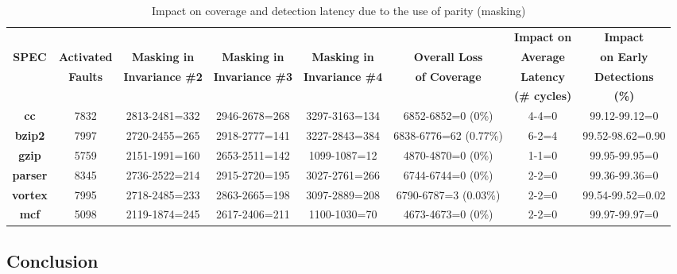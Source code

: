 \documentclass[12pt]{yalephd}
\begin{document}
\begin{table}[!ht]
\caption{Impact on coverage and detection latency due to the use of parity (masking)}\label{sC3tmasking}
\tiny
\tabcolsep=0.10cm
\begin{center}
\begin{tabular}{||c|c|c|c|c|c|c|c||}
\hline
\hline
 &  & & & & & {\bf Impact on}& {\bf Impact} \\
{\bf SPEC} & {\bf Activated} & {\bf Masking in} & {\bf Masking in} & {\bf Masking in} & {\bf Overall Loss } & {\bf Average} & {\bf on Early}\\
{\bf }  &{\bf Faults}  & {\bf Invariance \#2} & {\bf Invariance \#3} & {\bf Invariance \#4} & {\bf of Coverage} & {\bf Latency} & {\bf Detections}\\
 &  &  &  &  &  & {\bf (\# cycles)} & {\bf (\%)}\\

\hline
{\bf cc} & 7832 & 2813-2481=332 & 2946-2678=268 & 3297-3163=134 & 6852-6852=0 (0\%) & 4-4=0 & 99.12-99.12=0 \\
\hline
{\bf bzip2}  & 7997  & 2720-2455=265 & 2918-2777=141 & 3227-2843=384 & 6838-6776=62 (0.77\%) & 6-2=4 & 99.52-98.62=0.90\\
\hline
{\bf gzip} & 5759 & 2151-1991=160 & 2653-2511=142 & 1099-1087=12 & 4870-4870=0 (0\%)& 1-1=0 & 99.95-99.95=0\\
\hline
{\bf parser} & 8345 & 2736-2522=214 & 2915-2720=195 & 3027-2761=266 & 6744-6744=0 (0\%)& 2-2=0 & 99.36-99.36=0\\	
\hline
{\bf vortex} & 7995 & 2718-2485=233 & 2863-2665=198 & 3097-2889=208 & 6790-6787=3 (0.03\%) & 2-2=0 & 99.54-99.52=0.02\\
\hline
{\bf mcf} & 5098 & 2119-1874=245 & 2617-2406=211 & 1100-1030=70 & 4673-4673=0 (0\%) & 2-2=0 & 99.97-99.97=0\\
\hline
\hline
\end{tabular}
\end{center}
\end{table}

\subsection{Conclusion}\label{sC3sConclusion}
\end{document}
